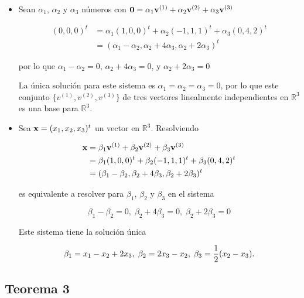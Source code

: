 \documentclass[12pt, a4paper]{article}
\numberwithin{subsection}{section} %
\begin{document}
        \begin{itemize}
        
            \item Sean $\alpha_1$, $\alpha_2$ y $\alpha_3$ números con ${\bf 0} = \alpha_1{\bf v}^{(1)} + \alpha_2{\bf v}^{(2)} + \alpha_3{\bf v}^{(3)}$
            
            \begin{align*}
                (0,0,0)^t & = \alpha_1(1,0,0)^t + \alpha_2(-1,1,1)^t + \alpha_3(0,4,2)^t \\
                & = (\alpha_1 - \alpha_2, \alpha_2 + 4\alpha_3, \alpha_2 + 2\alpha_3)^t
            \end{align*}
        
            por lo que $\alpha_1 - \alpha_2 = 0$, $\alpha_2 + 4\alpha_3 = 0$, y $\alpha_2 + 2\alpha_3 = 0$
        
            La única solución para este sistema es $\alpha_1 = \alpha_2 = \alpha_3 = 0$, por lo que este conjunto $\{v^{(1)}, v^{(2)}, v^{(3)}\}$ de tres vectores linealmente independientes en $\mathbb{R}^3$ es una base para $\mathbb{R}^3$.
        
            \item Sea ${\bf x} = (x_1, x_2, x_3)^t$ un vector en $\mathbb{R}^3$. Resolviendo
            
            \begin{align*}
                {\bf x} & = \beta_1{\bf v}^{(1)} + \beta_2{\bf v}^{(2)} + \beta_3{\bf v}^{(3)} \\
                        & = \beta_1(1,0,0)^t + \beta_2(-1,1,1)^t + \beta_3(0,4,2)^t \\
                        & = (\beta_1 - \beta_2, \beta_2 + 4\beta_3, \beta_2 + 2\beta_3)^t
            \end{align*}
        
            es equivalente a resolver para $\beta_1$, $\beta_2$ y $\beta_3$ en el sistema
        
            $$\beta_1 - \beta_2 = 0, \; \beta_2 + 4\beta_3 = 0, \; \beta_2 + 2\beta_3 = 0$$
        
            Este sistema tiene la solución única
        
            $$\beta_1 = x_1 - x_2 + 2x_3, \; \beta_2 = 2x_3 - x_2, \; \beta_3 = {1 \over 2}(x_2 - x_3).$$
            
        \end{itemize}
        
        \subsection{\textnormal{Teorema 3}}
        
\end{document}
